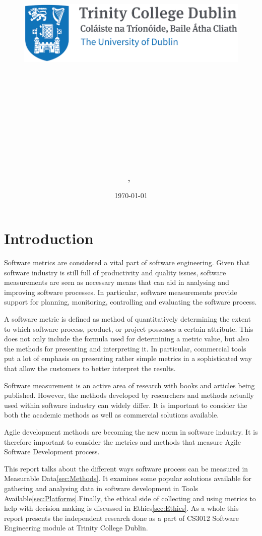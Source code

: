 \documentclass[11pt]{article}
\title{
\vspace{-1in}
\begin{figure}[!ht]
\flushleft
\includegraphics[width=0.4\linewidth]{reduced-trinity.png}
\end{figure}
\vspace{-0.5cm}
\hrulefill \\
\vspace{0.5cm}
\textmd{\textbf{\moduleCode\ \moduleName}}\\
\textmd{\textbf{\assignmentTitle}}\\
\vspace{0.5cm}
\hrulefill \\
}
\author{\textbf{\authorName,\ \authorID}}
\date{\today}
\begin{document}
\lstset{language=Java, captionpos=b, frame=single}
\captionsetup{width=.8\linewidth} 

\maketitle
\tableofcontents
\vspace{0.5in}

\section{Introduction}
\label{sec:Intro}
Software metrics are considered a vital part of software engineering.\cite{ieee-measurement-programs} Given that software industry is still full of productivity and quality issues, software measurements are seen as necessary means that can aid in analysing and improving software processes. In particular, software measurements provide support for planning, monitoring, controlling and evaluating the software process.\cite{Briand:2002:OPG:630832.631301} 

A software metric is defined as method of quantitatively determining the extent to which software process, product, or project possesses a certain attribute. This does not only include the formula used for determining a metric value, but also the methods for presenting and interpreting it.\cite{Daskalantonakis:1992:PVS:141344.141353} In particular, commercial tools put a lot of emphasis on presenting rather simple metrics in a sophisticated way that allow the customers to better interpret the results.

Software measurement is an active area of research with books and articles being published. However, the methods developed by researchers and methods actually used within software industry can widely differ. It is important to consider the both the academic methods as well as commercial solutions available.

Agile development methods are becoming the new norm in software industry.\cite{TARHAN2014477}\cite{hp-agile-report} It is therefore important to consider the metrics and methods that measure Agile Software Development process.

This report talks about the different ways software process can be measured in Measurable Data\ref{sec:Methods}. It examines some popular solutions available for gathering and analysing data in software development in Tools Available\ref{sec:Platforms}.Finally, the ethical side of collecting and using metrics to help with decision making is discussed in Ethics\ref{sec:Ethics}. As a whole this report presents the independent research done as a part of CS3012 Software Engineering module at Trinity College Dublin.
\end{document}
